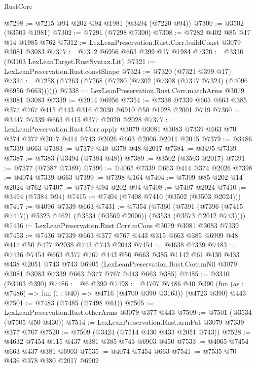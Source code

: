 \begin{lexlean}{RustCore}
\begin{coremodule}
@7298 := @7215 @94 @202 @94 @1981 (@3494 (@7220 @94))
@7300 := @3502 (@3503 @1981)
@7302 := @7291 (@7298 @7300)
@7308 := @7282 @402 @85 @17 @14 @1985 @762
@7312 := LexLeanPreservation.Rust.Corr.buildConst @3079 @3081 @3083
@7317 := @7312 @6956 @663 @399 @17 @1984
@7320 := @3310 (@3103 LexLeanTarget.RustSyntax.Lit)
@7321 := LexLeanPreservation.Rust.constShape
@7324 := @7320 (@7321 @399 @17)
@7334 := @7258 (@7263 (@7268 (@7280 (@7302 (@7308 (@7317 @7324) (@4096 @6956 @663))))))
@7338 := LexLeanPreservation.Rust.Corr.matchArms @3079 @3081 @3083
@7339 := @3914 @6956
@7354 := @7338 @7339 @663 @663 @385 @377 @767 @415 @443 @316 @2030 @6910 @50 @1928 @2001 @719
@7360 := @3447 @7339 @663 @415 @377 @2020 @2028
@7377 := LexLeanPreservation.Rust.Corr.apply
    @3079
    @3081
    @3083
    @7339
    @663
    @70
    @374
    @377
    @2017
    @414
    @743
    @2026
    @663
    @2006
    @2011
    @2015
@7379 := @3486 @7339 @663
@7383 := @7379 @48 @378 @48 @2017
@7384 := @3495 @7339
@7387 := @7383 (@3494 (@7384 @48))
@7389 := @3502 (@3503 @2017)
@7391 := @7377 (@7387 @7389)
@7396 := @4065 @7339 @663 @414 @374 @2026
@7398 := @4074 @7339 @663
@7399 := @7398 @164
@7404 := @7399 @85 @202 @14 @2024 @762
@7407 := @7379 @94 @202 @94
@7408 := @7407 @2024
@7410 := @3494 (@7384 @94)
@7415 := @7404 (@7408 @7410 (@3502 (@3503 @2024)))
@7417 := @4096 @7339 @663
@7431 := @7354
    (@7360
      (@7391 (@7396 (@7415 @7417)) @5323 @4621 (@3534 (@3569 @2006)) (@3534 (@3573 @2012 @743))))
@7436 := LexLeanPreservation.Rust.Corr.mCons @3079 @3081 @3083 @7339
@7453 := @7436
    @7339
    @663
    @377
    @767
    @443
    @315
    @663
    @385
    @6909
    @48
    @417
    @50
    @427
    @2038
    @743
    @743
    @2043
@7454 := @4638 @7339
@7483 := @7436
    @7454
    @663
    @377
    @767
    @443
    @50
    @663
    @385
    @1142
    @61
    @430
    @433
    @438
    @2051
    @743
    @743
    @6905
    (LexLeanPreservation.Rust.Corr.mNil @3079 @3081 @3083 @7339 @663 @377 @767 @443 @663 @385)
@7485 := @3310 (@3103 @390)
@7486 := @6 @390
@7498 := @4707
    @7486
    @40
    @390
    (fun (as : @7486) => fun (i : @40) => @4716 (@4700 @390 @3163))
    (@4723 @390)
    @443
@7501 := @7483 (@7485 (@7498 @61))
@7505 := LexLeanPreservation.Rust.otherArms @3079 @377 @443
@7509 := @7501 (@3534 (@7505 @50 @430))
@7514 := LexLeanPreservation.Rust.armPat @3079 @7339 @377 @767
@7520 := @7509 (@3424 (@7514 @430 @433 @2051 @743))
@7528 := @4632 @7454 @115 @437 @381 @385 @743 @6903 @450
@7533 := @4065 @7454 @663 @437 @381 @6903
@7535 := @4074 @7454 @663
@7541 := @7535 @70 @436 @378 @380 @2017 @6902

\end{coremodule}
\end{lexlean}
